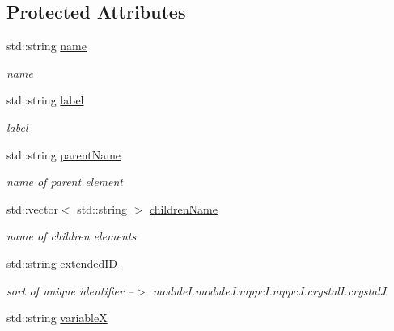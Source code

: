 \subsection*{Protected Attributes}
\begin{DoxyCompactItemize}
\item 
\hypertarget{classElement_a159736231f5227e65e36f4a9e5537afd}{std\+::string \hyperlink{classElement_a159736231f5227e65e36f4a9e5537afd}{name}}\label{classElement_a159736231f5227e65e36f4a9e5537afd}

\begin{DoxyCompactList}\small\item\em name \end{DoxyCompactList}\item 
\hypertarget{classElement_a2e3029a6dec4d74046ce1e4efe72d5f7}{std\+::string \hyperlink{classElement_a2e3029a6dec4d74046ce1e4efe72d5f7}{label}}\label{classElement_a2e3029a6dec4d74046ce1e4efe72d5f7}

\begin{DoxyCompactList}\small\item\em label \end{DoxyCompactList}\item 
\hypertarget{classElement_abe6237e9f33c87cca4e24ed5ebc51bfb}{std\+::string \hyperlink{classElement_abe6237e9f33c87cca4e24ed5ebc51bfb}{parent\+Name}}\label{classElement_abe6237e9f33c87cca4e24ed5ebc51bfb}

\begin{DoxyCompactList}\small\item\em name of parent element \end{DoxyCompactList}\item 
\hypertarget{classElement_ab1248ff46559a0cb27d56568e6e479f5}{std\+::vector$<$ std\+::string $>$ \hyperlink{classElement_ab1248ff46559a0cb27d56568e6e479f5}{children\+Name}}\label{classElement_ab1248ff46559a0cb27d56568e6e479f5}

\begin{DoxyCompactList}\small\item\em name of children elements \end{DoxyCompactList}\item 
\hypertarget{classElement_aff44a78d101de8f17f4448e0bc65e4a2}{std\+::string \hyperlink{classElement_aff44a78d101de8f17f4448e0bc65e4a2}{extended\+I\+D}}\label{classElement_aff44a78d101de8f17f4448e0bc65e4a2}

\begin{DoxyCompactList}\small\item\em sort of unique identifier --$>$ module\+I.\+module\+J.\+mppc\+I.\+mppc\+J.\+crystal\+I.\+crystal\+J \end{DoxyCompactList}\item 
\hypertarget{classElement_ab176775b7d8a64ad8a8cc24e1f0f3d3f}{std\+::string \hyperlink{classElement_ab176775b7d8a64ad8a8cc24e1f0f3d3f}{variable\+X}}\label{classElement_ab176775b7d8a64ad8a8cc24e1f0f3d3f}


\end{DoxyCompactItemize}

